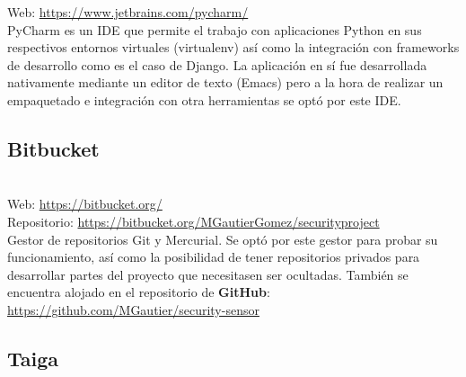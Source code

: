 Web: \url{https://www.jetbrains.com/pycharm/}\\

PyCharm es un IDE que permite el trabajo con aplicaciones Python en sus respectivos entornos virtuales (virtualenv) así como la integración con frameworks de desarrollo como es el caso de Django. La aplicación en sí fue desarrollada nativamente mediante un editor de texto (Emacs) pero a la hora de realizar un empaquetado e integración con otra herramientas se optó por este IDE. \\

\subsection{Bitbucket}

\\

Web: \url{https://bitbucket.org/}\\
Repositorio: \url{https://bitbucket.org/MGautierGomez/securityproject}\\

Gestor de repositorios Git y Mercurial. Se optó por este gestor para probar su funcionamiento, así como la posibilidad de tener repositorios privados para desarrollar partes del proyecto que necesitasen ser ocultadas. También se encuentra alojado en el repositorio de \textbf{GitHub}: \url{https://github.com/MGautier/security-sensor}\\

\subsection{Taiga}
\label{subsec:taiga}


